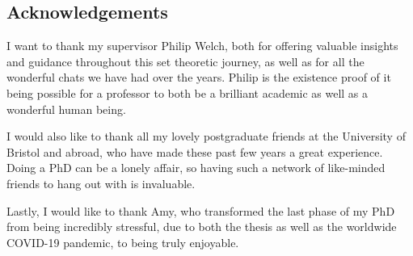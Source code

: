 \documentclass[../main]{subfiles}
\begin{document}
\newpage
\thispagestyle{fancy}
\setlength{\parindent}{10pt}

\begin{onehalfspacing}

  \vspace*{75pt}

  \section*{\huge Acknowledgements}
  I want to thank my supervisor Philip Welch, both for offering valuable insights and guidance throughout this set theoretic journey, as well as for all the wonderful chats we have had over the years. Philip is the existence proof of it being possible for a professor to both be a brilliant academic as well as a wonderful human being.

  I would also like to thank all my lovely postgraduate friends at the University of Bristol and abroad, who have made these past few years a great experience. Doing a PhD can be a lonely affair, so having such a network of like-minded friends to hang out with is invaluable.

  Lastly, I would like to thank Amy, who transformed the last phase of my PhD from being incredibly stressful, due to both the thesis as well as the worldwide COVID-19 pandemic, to being truly enjoyable.

\end{onehalfspacing}
\end{document}
